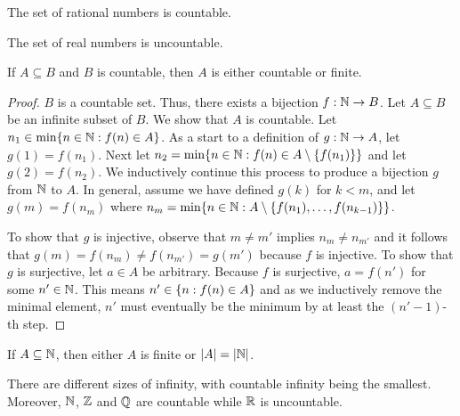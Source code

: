 \documentclass[11pt,twoside=off,numbers=noenddot]{scrbook}
\begin{document}
\begin{corollary}[$\QQ$ is countable]
    The set of rational numbers is countable.
\end{corollary}

\begin{corollary}[$\RR$ is uncountable]
    The set of real numbers is uncountable.
\end{corollary}

\begin{theorem}
    If $A \subseteq B$ and $B$ is countable, then $A$ is either countable or finite.
\end{theorem}

\begin{proof}
    $B$ is a countable set. Thus, there exists a bijection $f : \mathbb N \to B$. Let $A \subseteq B$ be an infinite subset of $B$. We show that $A$ is countable. Let $n_1 \in \min\{ n \in \mathbb N : f(n) \in A \}$. As a start to a definition of $g : \mathbb N \to A$, let $g(1) = f(n_1)$. Next let $n_2 = \min\{ n \in \mathbb N : f(n) \in A \setminus \{ f(n_1) \} \}$ and let $g(2) = f(n_2)$. We inductively continue this process to produce a bijection $g$ from $\mathbb N$ to $A$. In general, assume we have defined $g(k)$ for $k < m$, and let $g(m) = f(n_m)$ where $n_m = \min\{ n \in \mathbb N : A \setminus \{ f(n_1), \dots, f(n_{k - 1}) \} \}$.

    To show that $g$ is injective, observe that $m \neq m'$ implies $n_m \neq n_{m'}$ and it follows that $g(m) = f(n_m) \neq f(n_{m'}) = g(m')$ because $f$ is injective. To show that $g$ is surjective, let $a \in A$ be arbitrary. Because $f$ is surjective, $a = f(n')$ for some $n' \in \mathbb N$. This means $n' \in \{ n : f(n) \in A \}$ and as we inductively remove the minimal element, $n'$ must eventually be the minimum by at least the $(n' -1)$-th step.
\end{proof}

\begin{corollary}
    If $A \subseteq \mathbb N$, then either $A$ is finite or $| A | = | \mathbb N |$.
\end{corollary}

\begin{corollary}
    There are different sizes of infinity, with countable infinity being the smallest. Moreover, $\mathbb N$, $\mathbb Z$ and $\QQ$ are countable while $\RR$ is uncountable.
\end{corollary}
\end{document}
